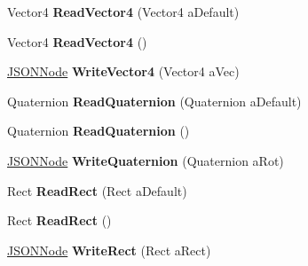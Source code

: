 \begin{DoxyCompactItemize}
\item 
Vector4 {\bfseries Read\+Vector4} (Vector4 a\+Default)\hypertarget{classSimpleJSON_1_1JSONNode_a154201773e3c3cf9da4ec914da0b3db8}{}\label{classSimpleJSON_1_1JSONNode_a154201773e3c3cf9da4ec914da0b3db8}

\item 
Vector4 {\bfseries Read\+Vector4} ()\hypertarget{classSimpleJSON_1_1JSONNode_a04cca4ce607b3918943db0b1db9c7e8b}{}\label{classSimpleJSON_1_1JSONNode_a04cca4ce607b3918943db0b1db9c7e8b}

\item 
\hyperlink{classSimpleJSON_1_1JSONNode}{J\+S\+O\+N\+Node} {\bfseries Write\+Vector4} (Vector4 a\+Vec)\hypertarget{classSimpleJSON_1_1JSONNode_a84f338447d0ed628de1c1c2d58248432}{}\label{classSimpleJSON_1_1JSONNode_a84f338447d0ed628de1c1c2d58248432}

\item 
Quaternion {\bfseries Read\+Quaternion} (Quaternion a\+Default)\hypertarget{classSimpleJSON_1_1JSONNode_ad115ed5a9de9ace0f3b3a4e65ea54b3a}{}\label{classSimpleJSON_1_1JSONNode_ad115ed5a9de9ace0f3b3a4e65ea54b3a}

\item 
Quaternion {\bfseries Read\+Quaternion} ()\hypertarget{classSimpleJSON_1_1JSONNode_a41b64fb1d7f8f6ff8738d9648710639d}{}\label{classSimpleJSON_1_1JSONNode_a41b64fb1d7f8f6ff8738d9648710639d}

\item 
\hyperlink{classSimpleJSON_1_1JSONNode}{J\+S\+O\+N\+Node} {\bfseries Write\+Quaternion} (Quaternion a\+Rot)\hypertarget{classSimpleJSON_1_1JSONNode_a45fe5f395e6c83645e1cb39aa3af4563}{}\label{classSimpleJSON_1_1JSONNode_a45fe5f395e6c83645e1cb39aa3af4563}

\item 
Rect {\bfseries Read\+Rect} (Rect a\+Default)\hypertarget{classSimpleJSON_1_1JSONNode_a4aae1151a3e4fbb1891ff3deb5a27c7d}{}\label{classSimpleJSON_1_1JSONNode_a4aae1151a3e4fbb1891ff3deb5a27c7d}

\item 
Rect {\bfseries Read\+Rect} ()\hypertarget{classSimpleJSON_1_1JSONNode_a9cd9934fe268446563a4c08c050bbfa1}{}\label{classSimpleJSON_1_1JSONNode_a9cd9934fe268446563a4c08c050bbfa1}

\item 
\hyperlink{classSimpleJSON_1_1JSONNode}{J\+S\+O\+N\+Node} {\bfseries Write\+Rect} (Rect a\+Rect)\hypertarget{classSimpleJSON_1_1JSONNode_a1bcc18f132246d261c611b4b55cc41b5}{}\label{classSimpleJSON_1_1JSONNode_a1bcc18f132246d261c611b4b55cc41b5}


\end{DoxyCompactItemize}
